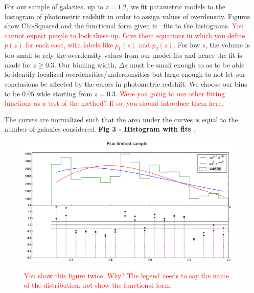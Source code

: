 \documentclass[twocolumn,useAMS,usenatbib]{mn2e}
\newcommand{\rachel}[1]{{\textcolor{red}{#1}}}
\begin{document}

For our sample of galaxies, up to $z=1.2$, we fit parametric models to the histogram of photometric redshift in order to assign values of overdensity. Figures show Chi-Squared and the functional form given in~\cite{Redshift_modelling} fits to the histograms.
\rachel{You cannot expect people to look these up.  Give them equations in which you define $p(z)$ for each case, with labels like $p_1(z)$ and $p_2(z)$.}
For low $z$, the volume is too small to rely the overdensity values from our model fits and hence the fit is made for $z \ge 0.3$. Our binning width, $\Delta z$ must be small enough so as to be able to identify localized overdensities/underdensities but large enough to not let our conclusions be affected by the errors in photometric redshift. 
We choose our bins to be $0.05$ wide starting from $z=0.3$. 
\rachel{Were you going to use other fitting functions as a test of the
  method?  If so, you should introduce them here.}

The curves are normalized such that the area under the curves is equal to the number of galaxies considered.
{\bf Fig 3 - Histogram with fits }. \\
\begin{figure}
 \centering
  \includegraphics[width=\columnwidth]{redshift_fluxlimited}
  \label{fig:redshift_fluxlimited}
  \caption{\rachel{You show this figure twice.  Why?  The legend needs to say the name of the distribution, not show the functional form.}}
\end{figure}
\end{document}
